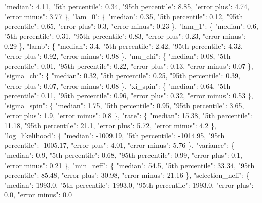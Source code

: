 {{          "median": 4.11, %
          "5th percentile": 0.34, %
          "95th percentile": 8.85, %
          "error plus": 4.74, %
          "error minus": 3.77%
        \}, %
        "lam\_0": \{%
          "median": 0.35, %
          "5th percentile": 0.12, %
          "95th percentile": 0.65, %
          "error plus": 0.3, %
          "error minus": 0.23%
        \}, %
        "lam\_1": \{%
          "median": 0.6, %
          "5th percentile": 0.31, %
          "95th percentile": 0.83, %
          "error plus": 0.23, %
          "error minus": 0.29%
        \}, %
        "lamb": \{%
          "median": 3.4, %
          "5th percentile": 2.42, %
          "95th percentile": 4.32, %
          "error plus": 0.92, %
          "error minus": 0.98%
        \}, %
        "mu\_chi": \{%
          "median": 0.08, %
          "5th percentile": 0.01, %
          "95th percentile": 0.22, %
          "error plus": 0.13, %
          "error minus": 0.07%
        \}, %
        "sigma\_chi": \{%
          "median": 0.32, %
          "5th percentile": 0.25, %
          "95th percentile": 0.39, %
          "error plus": 0.07, %
          "error minus": 0.08%
        \}, %
        "xi\_spin": \{%
          "median": 0.64, %
          "5th percentile": 0.11, %
          "95th percentile": 0.96, %
          "error plus": 0.32, %
          "error minus": 0.53%
        \}, %
        "sigma\_spin": \{%
          "median": 1.75, %
          "5th percentile": 0.95, %
          "95th percentile": 3.65, %
          "error plus": 1.9, %
          "error minus": 0.8%
        \}, %
        "rate": \{%
          "median": 15.38, %
          "5th percentile": 11.18, %
          "95th percentile": 21.1, %
          "error plus": 5.72, %
          "error minus": 4.2%
        \}, %
        "log\_likelihood": \{%
          "median": {-}1009.19, %
          "5th percentile": {-}1014.95, %
          "95th percentile": {-}1005.17, %
          "error plus": 4.01, %
          "error minus": 5.76%
        \}, %
        "variance": \{%
          "median": 0.9, %
          "5th percentile": 0.68, %
          "95th percentile": 0.99, %
          "error plus": 0.1, %
          "error minus": 0.21%
        \}, %
        "min\_neff": \{%
          "median": 54.5, %
          "5th percentile": 33.34, %
          "95th percentile": 85.48, %
          "error plus": 30.98, %
          "error minus": 21.16%
        \}, %
        "selection\_neff": \{%
          "median": 1993.0, %
          "5th percentile": 1993.0, %
          "95th percentile": 1993.0, %
          "error plus": 0.0, %
          "error minus": 0.0%
}}
